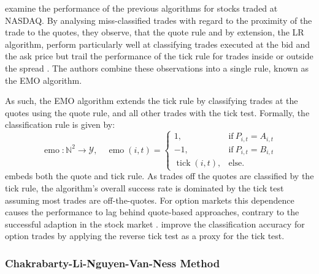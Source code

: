 \textcite[][536]{ellisAccuracyTradeClassification2000} examine the performance of the previous algorithms for stocks traded at \gls{NASDAQ}. By analysing miss-classified trades with regard to the proximity of the trade to the quotes, they observe, that the quote rule and by extension, the \gls{LR} algorithm, perform particularly well at classifying trades executed at the bid and the ask price but trail the performance of the tick rule for trades inside or outside the spread \autocite[][535--536]{ellisAccuracyTradeClassification2000}. The authors combine these observations into a single rule, known as the \gls{EMO} algorithm.

As such, the \gls{EMO} algorithm extends the tick rule by classifying trades at the quotes using the quote rule, and all other trades with the tick test. Formally, the classification rule is given by:
\begin{equation}
    \operatorname{emo} \colon \mathbb{N}^2 \to \mathcal{Y}, \quad
    \operatorname{emo}(i, t)=
    \begin{cases}
        1,                         & \mathrm{if}\ P_{i, t} = A_{i, t} \\
        -1,                        & \mathrm{if}\ P_{i, t} = B_{i, t} \\
        \operatorname{tick}(i, t), & \mathrm{else}.
    \end{cases}
    \label{eq:emo-rule}
\end{equation}
 embeds both the quote and tick rule. As trades off the quotes are classified by the tick rule, the algorithm's overall success rate is dominated by the tick test assuming most trades are off-the-quotes. For option markets \autocites[cp.][891]{savickasInferringDirectionOption2003}[][21]{grauerOptionTradeClassification2022} this dependence causes the performance to lag behind quote-based approaches, contrary to the successful adaption in the stock market \autocites[][541]{ellisAccuracyTradeClassification2000}[][3818]{chakrabartyTradeClassificationAlgorithms2007}. \textcite[][31--35]{grauerOptionTradeClassification2022} improve the classification accuracy for option trades by applying the reverse tick test as a proxy for the tick test.

\subsubsection{Chakrabarty-Li-Nguyen-Van-Ness
    Method}\label{sec:chakarabarty-li-nguyen-van-ness-method}

